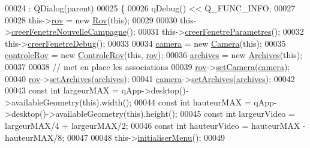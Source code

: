 \begin{DoxyCode}
00024     : QDialog(parent)
00025 \{
00026     qDebug() << Q\_FUNC\_INFO;
00027 
00028     this->\hyperlink{class_i_h_m_rov_a777ca33fdb295ba6b6773e880356fa1e}{rov} = \textcolor{keyword}{new} \hyperlink{class_rov}{Rov}(\textcolor{keyword}{this});
00029 
00030     this->\hyperlink{class_i_h_m_rov_a08bf623a890df272f738c1ff8631213f}{creerFenetreNouvelleCampagne}();
00031     this->\hyperlink{class_i_h_m_rov_aed451139ac09ef18b7c92637761d80ce}{creerFenetreParametres}();
00032     this->\hyperlink{class_i_h_m_rov_a30b49bada719a73e0899ad4bafb4de99}{creerFenetreDebug}();
00033 
00034     \hyperlink{class_i_h_m_rov_a0eda0e4726269508d4563d98064dca9d}{camera} = \textcolor{keyword}{new} \hyperlink{class_camera}{Camera}(\textcolor{keyword}{this});    
00035     \hyperlink{class_i_h_m_rov_a405b0c05970829fbf297ee0d26af9bca}{controleRov} = \textcolor{keyword}{new} \hyperlink{class_controle_rov}{ControleRov}(\textcolor{keyword}{this}, \hyperlink{class_i_h_m_rov_a777ca33fdb295ba6b6773e880356fa1e}{rov});
00036     \hyperlink{class_i_h_m_rov_a1e64353d7244219599c46450bb84e1df}{archives} = \textcolor{keyword}{new} \hyperlink{class_archives}{Archives}(\textcolor{keyword}{this});
00037 
00038     \textcolor{comment}{// met en place les associations}
00039     \hyperlink{class_i_h_m_rov_a777ca33fdb295ba6b6773e880356fa1e}{rov}->\hyperlink{class_rov_a0eba2119b89406948976ae92781c4629}{setCamera}(\hyperlink{class_i_h_m_rov_a0eda0e4726269508d4563d98064dca9d}{camera});
00040     \hyperlink{class_i_h_m_rov_a777ca33fdb295ba6b6773e880356fa1e}{rov}->\hyperlink{class_rov_acb3ecbb04ace455526206d3c05b712fd}{setArchives}(\hyperlink{class_i_h_m_rov_a1e64353d7244219599c46450bb84e1df}{archives});
00041     \hyperlink{class_i_h_m_rov_a0eda0e4726269508d4563d98064dca9d}{camera}->\hyperlink{class_camera_a66b844eec2b721a6ac23b80cb3fe2426}{setArchives}(\hyperlink{class_i_h_m_rov_a1e64353d7244219599c46450bb84e1df}{archives});
00042 
00043     \textcolor{keyword}{const} \textcolor{keywordtype}{int} largeurMAX = qApp->desktop()->availableGeometry(\textcolor{keyword}{this}).width();
00044     \textcolor{keyword}{const} \textcolor{keywordtype}{int} hauteurMAX = qApp->desktop()->availableGeometry(\textcolor{keyword}{this}).height();
00045     \textcolor{keyword}{const} \textcolor{keywordtype}{int} largeurVideo = largeurMAX/4 + largeurMAX/2;
00046     \textcolor{keyword}{const} \textcolor{keywordtype}{int} hauteurVideo = hauteurMAX - hauteurMAX/8;
00047 
00048     this->\hyperlink{class_i_h_m_rov_aebbcb2325c2d1a88a012d8408e2d6223}{initialiserMenu}();
00049 

\end{DoxyCode}
